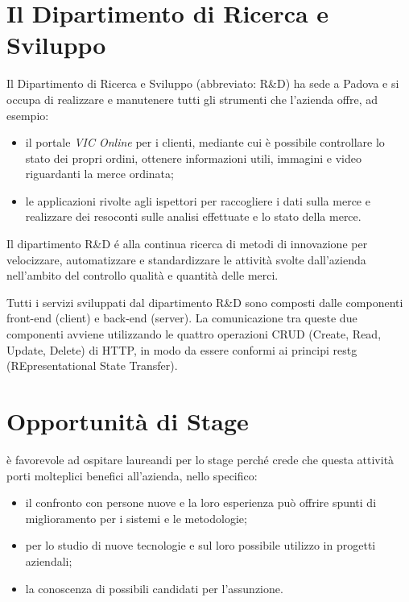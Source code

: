 \section{Il Dipartimento di Ricerca e Sviluppo} %
	Il Dipartimento di Ricerca e Sviluppo (abbreviato: R\&D) ha sede a Padova e si occupa di realizzare e manutenere tutti gli strumenti che l'azienda offre, ad esempio:
	\begin{itemize}
		\item il portale \emph{VIC Online} per i clienti, mediante cui è possibile controllare lo stato dei propri ordini, ottenere informazioni utili, immagini e video riguardanti la merce ordinata;
		\item le applicazioni rivolte agli ispettori per raccogliere i dati sulla merce e realizzare dei resoconti sulle analisi effettuate e lo stato della merce.
	\end{itemize}
	 
	Il dipartimento R\&D é alla continua ricerca di metodi di innovazione per velocizzare, automatizzare e standardizzare le attività svolte dall’azienda nell’ambito del controllo qualità e quantità delle merci.
	
	Tutti i servizi sviluppati dal dipartimento R\&D sono
	composti dalle componenti front-end (client) e back-end (server). La comunicazione tra
	queste due componenti avviene utilizzando le quattro operazioni CRUD (Create, Read, Update, Delete) di HTTP, in modo da essere conformi ai principi \gls{restg} (REpresentational State Transfer).
	

\section{Opportunità di Stage} %
	\vic{} è favorevole ad ospitare laureandi per lo stage perché crede che questa attività porti molteplici benefici all’azienda, nello specifico: \\
	\begin{itemize}
		\item il confronto con persone nuove e la loro esperienza può offrire spunti di miglioramento per i sistemi e le metodologie;
		\item per lo studio di nuove tecnologie e sul loro possibile utilizzo in progetti aziendali;
		\item la conoscenza di possibili candidati per l’assunzione.
	\end{itemize}
